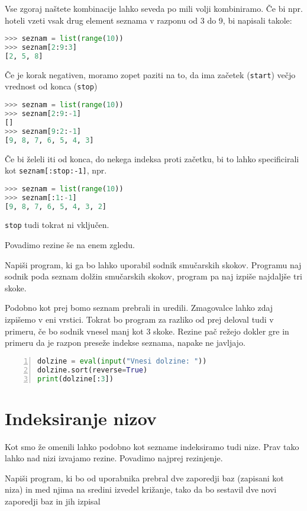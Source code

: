 Vse zgoraj naštete kombinacije lahko seveda po mili volji kombiniramo. Če bi npr. hoteli vzeti vsak drug element seznama v razponu od 3 do 9, bi napisali takole:
\begin{lstlisting}[language=Python]
>>> seznam = list(range(10))
>>> seznam[2:9:3]
[2, 5, 8]
\end{lstlisting}
Če je korak negativen, moramo zopet paziti na to, da ima začetek (\texttt{start}) večjo vrednost od konca (\texttt{stop})
\begin{lstlisting}[language=Python]
>>> seznam = list(range(10))
>>> seznam[2:9:-1]
[]
>>> seznam[9:2:-1]
[9, 8, 7, 6, 5, 4, 3]
\end{lstlisting}
Če bi želeli iti od konca, do nekega indeksa proti začetku, bi to lahko specificirali kot \texttt{seznam[:stop:-1]}, npr.
\begin{lstlisting}[language=Python]
>>> seznam = list(range(10))
>>> seznam[:1:-1]
[9, 8, 7, 6, 5, 4, 3, 2]
\end{lstlisting}
\texttt{stop} tudi tokrat ni vključen.

Povadimo rezine še na enem zgledu.
\begin{zgled}
Napiši program, ki ga bo lahko uporabil sodnik smučarskih skokov. Programu naj sodnik poda seznam dolžin smučarskih skokov, program pa naj izpiše najdaljše tri skoke.
\end{zgled}

\begin{resitev}
Podobno kot prej bomo seznam prebrali in uredili. Zmagovalce lahko zdaj izpišemo v eni vrstici. Tokrat bo program za razliko od prej deloval tudi v primeru, če bo sodnik vnesel manj kot 3 skoke. Rezine pač režejo dokler gre in primeru da je razpon preseže indekse seznama, napake ne javljajo.
\begin{lstlisting}[language=Python,numbers=left]
dolzine = eval(input("Vnesi dolzine: "))
dolzine.sort(reverse=True)
print(dolzine[:3])
\end{lstlisting}
\end{resitev}

\section{Indeksiranje nizov}
Kot smo že omenili lahko podobno kot sezname indeksiramo tudi nize. Prav tako lahko nad nizi izvajamo rezine. Povadimo najprej rezinjenje.

\begin{zgled}
Napiši program, ki bo od uporabnika prebral dve zaporedji baz (zapisani kot niza) in med njima na sredini izvedel križanje, tako da bo sestavil dve novi zaporedji baz in jih izpisal
\end{zgled}

